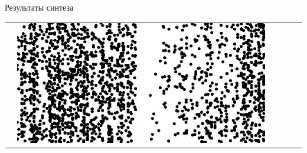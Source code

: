 \documentclass[12pt]{beamer}
\begin{document}
\begin{frame}{Результаты синтеза}
\begin{table}
\begin{center}
\begin{tabular}{p{1.2cm} p{1.2cm} p{1.2cm} p{1.2cm} p{1.2cm} p{1.2cm} p{1.2cm}}
					&
					\includegraphics[width=1\linewidth]{8-results/sand-trend2/right2}
					&
					\includegraphics[width=1\linewidth]{8-results/sand-trend2/pan2}
					&

\end{tabular}
\end{center}
\end{table}
\end{frame}
\end{document}
